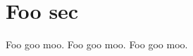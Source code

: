 \documentclass[ twoside,
                openright,
                numbers=noenddot,
                headinclude,
                footinclude=true,
                cleardoublepage=empty,
                abstractoff, 
                BCOR=5mm,
                paper=letter,
                fontsize=11pt,
                american ]{scrreprt}
\begin{document}
\frenchspacing
\raggedbottom
{} 
\pagestyle{plain}
\pagestyle{scrheadings}

   \section{Foo sec}
Foo goo moo.
\clearpage
Foo goo moo.
Foo goo moo.


%
%
%
\end{document}
